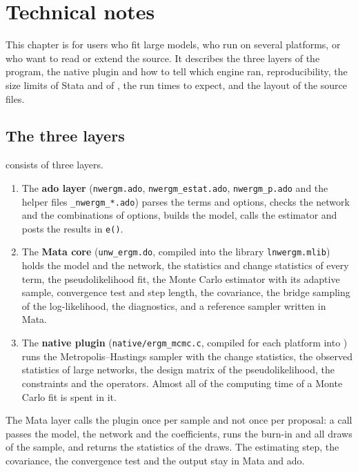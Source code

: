 \chapter{Technical notes}\label{ch:technical}

This chapter is for users who fit large models, who run \nwergm{} on several platforms, or who want to read or extend the source. It describes the three layers of the program, the native plugin and how to tell which engine ran, reproducibility, the size limits of Stata and of \nwergm{}, the run times to expect, and the layout of the source files.

\section{The three layers}

\nwergm{} consists of three layers.
\begin{enumerate}[nosep]
  \item The \textbf{ado layer} (\texttt{nwergm.ado}, \texttt{nwergm\_estat.ado}, \texttt{nwergm\_p.ado} and the helper files \texttt{\_nwergm\_*.ado}) parses the terms and options, checks the network and the combinations of options, builds the model, calls the estimator and posts the results in \texttt{e()}.
  \item The \textbf{Mata core} (\texttt{unw\_ergm.do}, compiled into the library \texttt{lnwergm.mlib}) holds the model and the network, the statistics and change statistics of every term, the pseudolikelihood fit, the Monte Carlo estimator with its adaptive sample, convergence test and step length, the covariance, the bridge sampling of the log-likelihood, the diagnostics, and a reference sampler written in Mata.
  \item {\sloppy The \textbf{native plugin} (\texttt{native/ergm\_mcmc.c}, compiled for each platform into \allowbreak{}) runs the Metropolis--Hastings sampler with the change statistics, the observed statistics of large networks, the design matrix of the pseudolikelihood, the constraints and the operators. Almost all of the computing time of a Monte Carlo fit is spent in it.\par}
\end{enumerate}
The Mata layer calls the plugin once per sample and not once per proposal: a call passes the model, the network and the coefficients, runs the burn-in and all draws of the sample, and returns the statistics of the draws. The estimating step, the covariance, the convergence test and the output stay in Mata and ado.

